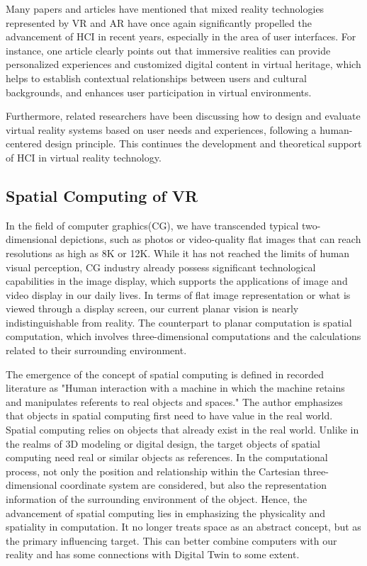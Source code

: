 Many papers and articles\cite{paper9} have mentioned that mixed reality technologies represented by VR and AR have once again significantly propelled the advancement of HCI in recent years, especially in the area of user interfaces. For instance, one article\cite{paper10} clearly points out that immersive realities can provide personalized experiences and customized digital content in virtual heritage, which helps to establish contextual relationships between users and cultural backgrounds, and enhances user participation in virtual environments.

Furthermore, related researchers have been discussing how to design and evaluate virtual reality systems based on user needs and experiences, following a human-centered design principle. This continues the development and theoretical support of HCI in virtual reality technology.

\subsection{Spatial Computing of VR}
In the field of computer graphics(CG), we have transcended typical two-dimensional depictions, such as photos or video-quality flat images that can reach resolutions as high as 8K or 12K. While it has not reached the limits of human visual perception, CG industry already possess significant technological capabilities in the image display, which supports the applications of image and video display in our daily lives. In terms of flat image representation or what is viewed through a display screen, our current planar vision is nearly indistinguishable from reality. The counterpart to planar computation is spatial computation, which involves three-dimensional computations and the calculations related to their surrounding environment.

The emergence of the concept of spatial computing is defined in recorded literature as "Human interaction with a machine in which the machine retains and manipulates referents to real objects and spaces."\cite{paper11e} The author emphasizes that objects in spatial computing first need to have value in the real world. Spatial computing relies on objects that already exist in the real world. Unlike in the realms of 3D modeling or digital design, the target objects of spatial computing need real or similar objects as references. In the computational process, not only the position and relationship within the Cartesian three-dimensional coordinate system are considered, but also the representation information of the surrounding environment of the object. Hence, the advancement of spatial computing lies in emphasizing the physicality and spatiality in computation. It no longer treats space as an abstract concept, but as the primary influencing target. This can better combine computers with our reality and has some connections with Digital Twin to some extent.

